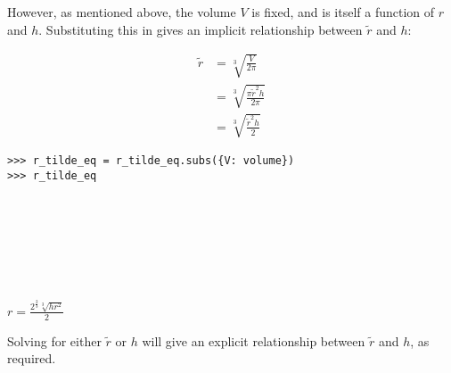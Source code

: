 \documentclass[12pt]{article}
\begin{document}
\vspace{0.5cm}

\begin{mdframed}[linewidth=0.5mm, backgroundcolor=orange!10]
However, as mentioned above, the volume $V$ is fixed, and is itself a function of $r$ and $h$. Substituting this in gives an implicit relationship between $\tilde{r}$ and $h$:
\end{mdframed}

\begin{minipage}[t]{.37\textwidth} %
\begin{mdframed}[linewidth=0.5mm, backgroundcolor=cyan!10]
\begin{align*}
\tilde{r} &= \sqrt[3]{\frac{V}{2\pi}} \\
&= \sqrt[3]{\frac{\pi \tilde{r}^2 h}{2\pi}} \\
&= \sqrt[3]{\frac{\tilde{r}^2 h}{2}}
\end{align*}
\vspace{3mm}
\end{mdframed}
\end{minipage} %
\begin{minipage}[t]{.63\textwidth} %
\begin{verbatim}
>>> r_tilde_eq = r_tilde_eq.subs({V: volume})
>>> r_tilde_eq








\end{verbatim}
\vspace{-4.5cm}

\hspace{0.5cm}\begin{minipage}{\textwidth}$r = \frac{2^{\frac{2}{3}} \sqrt[3]{h r^2}}{2}$\end{minipage}
\end{minipage}

\vspace{0.5cm}

\begin{mdframed}[linewidth=0.5mm, backgroundcolor=orange!10]
Solving for either $\tilde{r}$ or $h$ will give an explicit relationship between $\tilde{r}$ and $h$, as required.
\end{mdframed}
\end{document}
